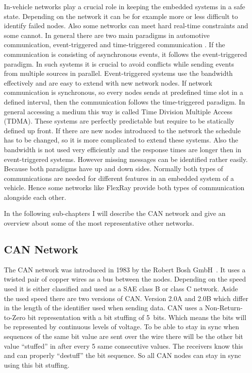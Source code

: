 In-vehicle networks play a crucial role in keeping the embedded systems in a
safe state. Depending on the network it can be for example more or less
difficult to identify failed nodes. Also some networks can meet hard real-time
constraints and some cannot. In general there are two main paradigms in
automotive communication, event-triggered and time-triggered communication
\cite{Navet2017}. If the communication is consisting of asynchronous events, it
follows the event-triggered paradigm. In such systems it is crucial to avoid
conflicts while sending events from multiple sources in parallel.
Event-triggered systems use the bandwidth effectively and are easy to extend
with new network nodes. If network communication is synchronous, so every nodes
sends at predefined time slot in a defined interval, then the communication
follows the time-triggered paradigm. In general accessing a medium this way is
called Time Division Multiple Access (TDMA). These systems are perfectly
predictable but require to be statically defined up front. If there are new
nodes introduced to the network the schedule has to be changed, so it is more
complicated to extend these systems. Also the bandwidth is not used very
efficiently and the response times are longer then in event-triggered systems.
However missing messages can be identified rather easily. Because both paradigms
have up and down sides. Normally both types of communications are needed for
different features in an embedded system of a vehicle. Hence some networks like
FlexRay provide both types of communication alongside each other.

In the following sub-chapters I will describe the CAN network and give an
overview about some of the most representative other networks.

\subsection{CAN Network}

The CAN network was introduced in 1983 by the Robert Bosh GmbH~\cite{Navet2017}.
It uses a twisted pair of copper wires as a bus between the nodes. Depending on
the speed used it is either classified and used as a SAE class B or class C
network. Aside the used speed there are two versions of CAN\@. Version 2.0A and
2.0B which differ in the length of the identifier used when sending data. CAN
uses a Non-Return-to-Zero bit representation with a bit stuffing of 5~bits.
Which means the bits will be represented by continuous levels of voltage. To be
able to stay in sync when sequences of the same bit value are sent over the wire
there will be the other bit value ``stuffed'' in after every 5 same consecutive
values. The receivers know this and can properly ``destuff'' the bit sequence.
So all CAN nodes can stay in sync using this bit stuffing. 

